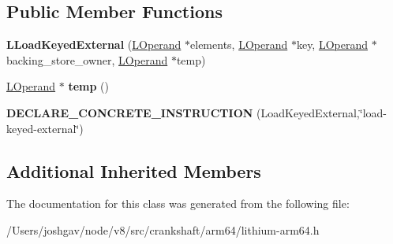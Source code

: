 \subsection*{Public Member Functions}
\begin{DoxyCompactItemize}
\item 
{\bfseries L\+Load\+Keyed\+External} (\hyperlink{classv8_1_1internal_1_1_l_operand}{L\+Operand} $\ast$elements, \hyperlink{classv8_1_1internal_1_1_l_operand}{L\+Operand} $\ast$key, \hyperlink{classv8_1_1internal_1_1_l_operand}{L\+Operand} $\ast$backing\+\_\+store\+\_\+owner, \hyperlink{classv8_1_1internal_1_1_l_operand}{L\+Operand} $\ast$temp)\hypertarget{classv8_1_1internal_1_1_l_load_keyed_external_a60dce4250facccba0919662a8de302b6}{}\label{classv8_1_1internal_1_1_l_load_keyed_external_a60dce4250facccba0919662a8de302b6}

\item 
\hyperlink{classv8_1_1internal_1_1_l_operand}{L\+Operand} $\ast$ {\bfseries temp} ()\hypertarget{classv8_1_1internal_1_1_l_load_keyed_external_a472b3d904346536be4dc00ee615fa015}{}\label{classv8_1_1internal_1_1_l_load_keyed_external_a472b3d904346536be4dc00ee615fa015}

\item 
{\bfseries D\+E\+C\+L\+A\+R\+E\+\_\+\+C\+O\+N\+C\+R\+E\+T\+E\+\_\+\+I\+N\+S\+T\+R\+U\+C\+T\+I\+ON} (Load\+Keyed\+External,\char`\"{}load-\/keyed-\/external\char`\"{})\hypertarget{classv8_1_1internal_1_1_l_load_keyed_external_a806bd0cb216d7c34bf8ebede5033279b}{}\label{classv8_1_1internal_1_1_l_load_keyed_external_a806bd0cb216d7c34bf8ebede5033279b}

\end{DoxyCompactItemize}
\subsection*{Additional Inherited Members}


The documentation for this class was generated from the following file\+:\begin{DoxyCompactItemize}
\item 
/\+Users/joshgav/node/v8/src/crankshaft/arm64/lithium-\/arm64.\+h\end{DoxyCompactItemize}
